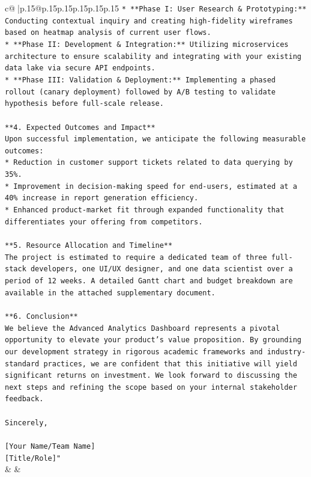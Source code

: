 \documentclass{article}
\begin{document}
{\begin{supertabular}{c@{$\;$}|p{.15\linewidth}@{}p{.15\linewidth}p{.15\linewidth}p{.15\linewidth}p{.15\linewidth}p{.15\linewidth}}
{{{\texttt{*   **Phase I: User Research \& Prototyping:** Conducting contextual inquiry and creating high{-}fidelity wireframes based on heatmap analysis of current user flows.} \\
\texttt{*   **Phase II: Development \& Integration:** Utilizing microservices architecture to ensure scalability and integrating with your existing data lake via secure API endpoints.} \\
\texttt{*   **Phase III: Validation \& Deployment:** Implementing a phased rollout (canary deployment) followed by A/B testing to validate hypothesis before full{-}scale release.} \\
\\ 
\texttt{**4. Expected Outcomes and Impact**} \\
\texttt{Upon successful implementation, we anticipate the following measurable outcomes:} \\
\texttt{*   Reduction in customer support tickets related to data querying by 35\%.} \\
\texttt{*   Improvement in decision{-}making speed for end{-}users, estimated at a 40\% increase in report generation efficiency.} \\
\texttt{*   Enhanced product{-}market fit through expanded functionality that differentiates your offering from competitors.} \\
\\ 
\texttt{**5. Resource Allocation and Timeline**} \\
\texttt{The project is estimated to require a dedicated team of three full{-}stack developers, one UI/UX designer, and one data scientist over a period of 12 weeks. A detailed Gantt chart and budget breakdown are available in the attached supplementary document.} \\
\\ 
\texttt{**6. Conclusion**} \\
\texttt{We believe the Advanced Analytics Dashboard represents a pivotal opportunity to elevate your product's value proposition. By grounding our development strategy in rigorous academic frameworks and industry{-}standard practices, we are confident that this initiative will yield significant returns on investment. We look forward to discussing the next steps and refining the scope based on your internal stakeholder feedback.} \\
\\ 
\texttt{Sincerely,} \\
\\ 
\texttt{{[}Your Name/Team Name{]}} \\
\texttt{{[}Title/Role{]}"} \\
            }
        }
    }
    & & \\ \\


\end{supertabular}}
\end{document}
